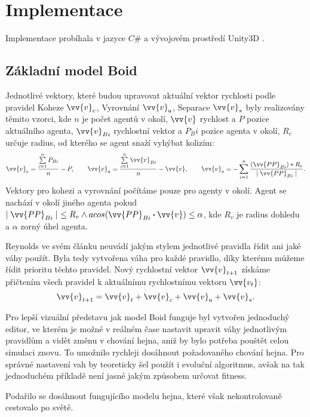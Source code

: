 \section{Implementace}
Implementace probíhala v jazyce $C\#$ a vývojovém prostředí Unity3D \cite{Unity}. 
\subsection{Základní model Boid}
Jednotlivé vektory, které budou upravovat aktuální vektor rychlosti podle pravidel Koheze $\vv{v}_c$, Vyrovnání $\vv{v}_a$, Separace $\vv{v}_s$ byly realizovány těmito vzorci, kde $n$ je počet agentů v okolí, $\vv{v}$ rychlost a $P$ pozice aktuálního agenta, $\vv{v}_{Bi}$ rychlostní vektor a $P_Bi$ pozice agenta v okolí, $R_c$ určuje radius, od kterého se agent snaží vyhýbat kolizím: 
\begin{equation*}
\vv{v}_c = \frac{ \sum\limits_{i=1}^n{P_{Bi} } }{ n } - P, \qquad
\vv{v}_a = \frac{ \sum\limits_{i=1}^n{\vv{v}_{Bi} } }{ n } - \vv{v}, \qquad
\vv{v}_s = -\sum\limits_{i=1}^n{ \frac{(\vv{PP}_{Bi}) * R_c}{\mid \vv{PP}_{Bi}\mid}}.
\end{equation*}
Vektory pro kohezi a vyrovnání počítáme pouze pro agenty v okolí. Agent se nachází v okolí jiného agenta pokud $\mid\vv{PP}_{Bi}\mid \ \leq R_v \land acos(\vv{PP}_{Bi} \boldsymbol{\cdot} \vv{v}) \leq \alpha $, kde $R_v$ je radius dohledu a $\alpha$ zorný úhel agenta. 
\par
Reynolds ve svém článku neuvádí jakým stylem jednotlivé pravidla řídit ani jaké váhy použít. Byla tedy vytvořena váha pro každé pravidlo, díky kterému můžeme řídit prioritu těchto pravidel. Nový rychlostní vektor $\vv{v}_{t+1}$ získáme přičtením všech pravidel k aktuálnímu rychlostnímu vektoru $\vv{v_t}$: 
\begin{equation*}
\vv{v}_{t+1} = \vv{v}_t + \vv{v}_c + \vv{v}_a + \vv{v}_s. 
\end{equation*}
\par
Pro lepší vizuální představu jak model Boid funguje byl vytvořen jednoduchý editor, ve kterém je možné v reálném čase nastavit upravit váhy jednotlivým pravidlům a vidět změnu v chování hejna, aniž by bylo potřeba pouštět celou simulaci znovu. To umožnilo rychleji dosáhnout požadovaného chování hejna. Pro správné nastavení vah by teoreticky šel použít i evoluční algoritmus, avšak na tak jednoduchém příkladě není jasné jakým způsobem určovat fitness. 
\par
Podařilo se dosáhnout fungujícího modelu hejna, které však nekontrolovaně cestovalo po světě. 

